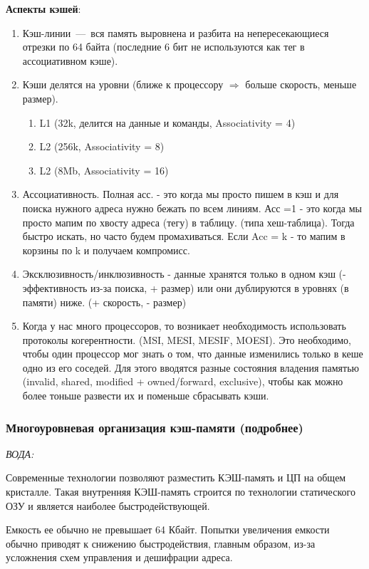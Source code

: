 \documentclass{article}
\begin{document}
\textbf{Аспекты кэшей}:
\begin{enumerate}
	\item Кэш-линии~---~вся память выровнена и разбита на непересекающиеся отрезки по 64 байта (последние 6 бит не используются как тег в ассоциативном кэше). 
	\item Кэши делятся на уровни (ближе к процессору $\Rightarrow$ больше скорость, меньше размер). 
		\begin{enumerate}
			\item L1 (32k, делится на данные и команды, Associativity = 4)
			\item L2 (256k, Associativity = 8)
			\item L2 (8Mb, Associativity = 16)
		\end{enumerate}
	\item Ассоциативность. Полная асс. - это когда мы просто пишем в кэш и для поиска нужного адреса нужно бежать по всем линиям. Асс =1 - это когда мы просто мапим по хвосту адреса (тегу) в таблицу. (типа хеш-таблица). Тогда быстро искать, но часто будем промахиваться. Если Acc = k - то мапим в корзины по k и получаем компромисс.
	\item  Эксклюзивность/инклюзивность - данные хранятся только в одном кэш (- эффективность из-за поиска, + размер) или они дублируются в уровнях (в памяти) ниже. (+ скорость, - размер)
	\item Когда у нас много процессоров, то возникает необходимость использовать протоколы когерентности. (MSI, MESI, MESIF, MOESI). Это необходимо, чтобы один процессор мог знать о том, что данные изменились только в кеше одно из его соседей. Для этого вводятся разные состояния владения памятью (invalid, shared, modified + owned/forward, exclusive), чтобы как можно более тоньше развести их и поменьше сбрасывать кэши.
\end{enumerate}

\subsubsection{Многоуровневая организация кэш-памяти (подробнее)}

\emph{ВОДА:}

Современные технологии позволяют разместить КЭШ-память и ЦП на общем кристалле. Такая внутренняя КЭШ-память строится по технологии статического ОЗУ и является наиболее быстродействующей. 

Емкость ее обычно не превышает 64 Кбайт. Попытки увеличения емкости обычно приводят к снижению быстродействия, главным образом, из-за усложнения схем управления и дешифрации адреса. 
\end{document}
